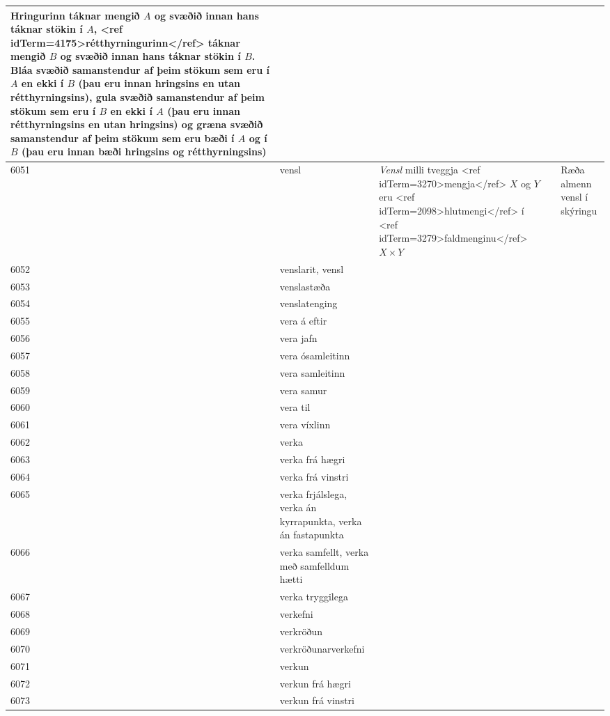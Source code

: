 \begin{longtable}{p{}|p{}|p{}|p{}|p{}}
Hringurinn táknar mengið $A$ og svæðið innan hans táknar stökin í $A$, <ref idTerm=4175>rétthyrningurinn</ref> táknar mengið $B$ og svæðið innan hans táknar stökin í $B$. Bláa svæðið samanstendur af þeim stökum sem eru í $A$ en ekki í $B$ (þau eru innan hringsins en utan rétthyrningsins), gula svæðið samanstendur af þeim stökum sem eru í $B$ en ekki í $A$ (þau eru innan rétthyrningsins en utan hringsins) og græna svæðið samanstendur af þeim stökum sem eru bæði í $A$ og í $B$ (þau eru innan bæði hringsins og rétthyrningsins) & \\
\hline
6051 & vensl & \textit{Vensl} milli tveggja <ref idTerm=3270>mengja</ref> $X$ og $Y$ eru <ref idTerm=2098>hlutmengi</ref> í <ref idTerm=3279>faldmenginu</ref> $X \times Y$ &  & Ræða almenn vensl í skýringu \\
\hline
6052 & venslarit, vensl &  &  &  \\
\hline
6053 & venslastæða &  &  &  \\
\hline
6054 & venslatenging &  &  &  \\
\hline
6055 & vera á eftir &  &  &  \\
\hline
6056 & vera jafn &  &  &  \\
\hline
6057 & vera ósamleitinn &  &  &  \\
\hline
6058 & vera samleitinn &  &  &  \\
\hline
6059 & vera samur &  &  &  \\
\hline
6060 & vera til &  &  &  \\
\hline
6061 & vera víxlinn &  &  &  \\
\hline
6062 & verka &  &  &  \\
\hline
6063 & verka frá hægri &  &  &  \\
\hline
6064 & verka frá vinstri &  &  &  \\
\hline
6065 & verka frjálslega, verka án kyrrapunkta, verka án fastapunkta &  &  &  \\
\hline
6066 & verka samfellt, verka með samfelldum hætti &  &  &  \\
\hline
6067 & verka tryggilega &  &  &  \\
\hline
6068 & verkefni &  &  &  \\
\hline
6069 & verkröðun &  &  &  \\
\hline
6070 & verkröðunarverkefni &  &  &  \\
\hline
6071 & verkun &  &  &  \\
\hline
6072 & verkun frá hægri &  &  &  \\
\hline
6073 & verkun frá vinstri &  &  &  \\

\end{longtable}
